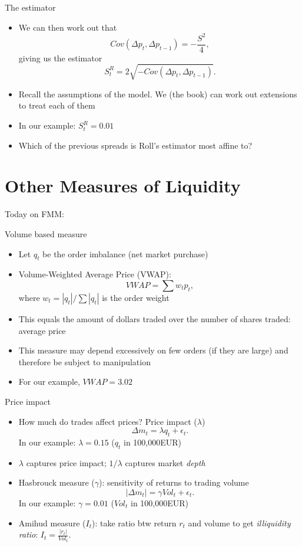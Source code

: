 \begin{frame}{The estimator}
	\begin{itemize}
		\item We can then work out that
		\[
		Cov(\Delta p_t, \Delta p_{t-1}) = - \frac{S^2}{4},
		\]
		giving us the estimator
		\[
		S^R_t = 2 \sqrt{-Cov(\Delta p_t, \Delta p_{t-1})}.
		\]
		\item Recall the assumptions of the model. We (the book) can work out extensions to treat each of them
		\item In our example: $S^R_t = 0.01$
		\item Which of the previous spreads is Roll's estimator most affine to?
	\end{itemize}
\end{frame}


\section{Other Measures of Liquidity}

\begin{frame}{Today on FMM:}
	\tableofcontents[currentsection]
\end{frame}


\begin{frame}{Volume based measure}
\begin{itemize}
	\item Let $q_t$ be the order imbalance (net market purchase)
	\item \alert{Volume-Weighted Average Price} (VWAP):
	\[
	VWAP = \sum  w_t p_t,
	\]
	where $w_t = |q_t|/\sum |q_t|$ is the order weight
	\item  This equals the amount of dollars traded over the number of shares traded: average price
	\item This measure may depend excessively on few orders (if they are large) and therefore be subject to manipulation
	\item For our example, $VWAP=3.02$
\end{itemize}
\end{frame}


\begin{frame}{Price impact}
\begin{itemize}
	\item How much do trades affect prices? \alert{Price impact} ($\lambda$)
	\[
	\Delta m_t = \lambda q_t + \epsilon_t.
	\]
	In our example: $\lambda = 0.15 $ ($q_t$ in 100,000EUR)
	\item  $\lambda$ captures price impact;  $1/\lambda$ captures market \textit{depth}
	\item \alert{Hasbrouck measure} ($\gamma$): sensitivity of returns to trading volume
	\[
	|\Delta m_t | = \gamma Vol_t + \epsilon_t.
	\]
	In our example: $\gamma = 0.01$ ($Vol_t$ in 100,000EUR)
	\item \alert{Amihud measure} ($I_t$): take ratio btw return $r_t$ and volume to get \textit{illiquidity ratio}: 
	\center
	$I_t = \frac{|r_t|}{Vol_t}$.
\end{itemize}
\end{frame}


